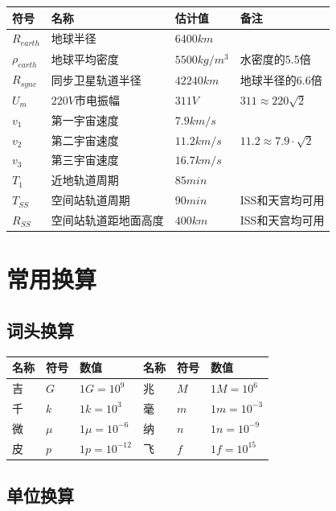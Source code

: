\begin{center}
\begin{tabular}{|l|l|l|l|}
\hline
\textbf{符号} & \textbf{名称} & \textbf{估计值} & \textbf{备注} \\
\hline
$R_{earth}$ & 地球半径  & $6400 km$  & \\
$\rho_{earth}$ & 地球平均密度 & $5500 kg/m^3$ & 水密度的5.5倍 \\
$R_{sync}$ & 同步卫星轨道半径  & $42240km$ & 地球半径的$6.6$倍\\
$U_{m}$ & $220V$市电振幅 & $311 V$ & $311 \approx 220 \sqrt{2}$\\
$v_{1}$ & 第一宇宙速度 & $7.9km/s$ & \\
$v_{2}$ & 第二宇宙速度 & $11.2km/s$ & $11.2 \approx 7.9 \cdot \sqrt{2}$\\
$v_{3}$ & 第三宇宙速度 & $16.7km/s$ & \\
$T_{1}$ & 近地轨道周期 & $85min$ & \\
$T_{SS}$ & 空间站轨道周期 & $90min$ & ISS和天宫均可用\\
$R_{SS}$ & 空间站轨道距地面高度 & $400km$ & ISS和天宫均可用\\
\hline
\end{tabular}
\end{center}

\section{常用换算}

\subsection{词头换算}

\begin{center}
\begin{tabular}{|l|l|l||l|l|l|}
\hline
\textbf{名称} & \textbf{符号} & \textbf{数值} & \textbf{名称} & \textbf{符号} & \textbf{数值} \\
\hline
吉 & $G$ & $1G=10^{9}$ & 兆 & $M$ & $1M = 10^6$ \\ 
千 & $k$ & $1k=10^3$  & 毫 & $m$ & $1m=10^{-3}$\\
微 & $\mu$ & $1\mu = 10^{-6}$ & 纳 & $n$ & $1n=10^{-9}$\\
皮 & $p$ & $1p = 10^{-12}$ & 飞 & $f$ & $1f=10^{15}$\\
\hline
\end{tabular}
\end{center}

\subsection{单位换算}

